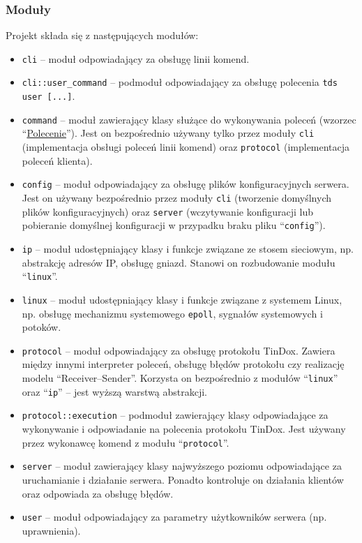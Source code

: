 \documentclass[8pt,a4paper]{article}
\newcommand{\quotes}[1]{``#1''}
\newcommand{\quotcode}[1]{\quotes{\texttt{#1}}}
\begin{document}
\subsubsection{Moduły}
\noindent Projekt składa się z następujących modułów:
\begin{itemize}
    \item \texttt{cli} -- moduł odpowiadający za obsługę linii komend.
    \item \texttt{cli::user\_command} -- podmoduł odpowiadający za obsługę polecenia \texttt{tds user [...]}.
    \item \texttt{command} -- moduł zawierający klasy służące do wykonywania poleceń (wzorzec \quotes{\href{https://en.wikipedia.org/wiki/Command_pattern}{Polecenie}}). Jest on bezpośrednio używany tylko przez moduły \texttt{cli} (implementacja obsługi poleceń linii komend) oraz \texttt{protocol} (implementacja poleceń klienta).
    \item \texttt{config} -- moduł odpowiadający za obsługę plików konfiguracyjnych serwera. Jest on używany bezpośrednio przez moduły \texttt{cli} (tworzenie domyślnych plików konfiguracyjnych) oraz \texttt{server} (wczytywanie konfiguracji lub pobieranie domyślnej konfiguracji w przypadku braku pliku \quotcode{config}).
    \item \texttt{ip} -- moduł udostępniający klasy i funkcje związane ze stosem sieciowym, np. abstrakcję adresów IP, obsługę gniazd. Stanowi on rozbudowanie modułu \quotcode{linux}.
    \item \texttt{linux} -- moduł udostępniający klasy i funkcje związane z systemem Linux, np. obsługę mechanizmu systemowego \texttt{epoll}, sygnałów systemowych i potoków.
    \item \texttt{protocol} -- moduł odpowiadający za obsługę protokołu TinDox. Zawiera między innymi interpreter poleceń, obsługę błędów protokołu czy realizację modelu \quotes{Receiver--Sender}. Korzysta on bezpośrednio z modułów \quotcode{linux} oraz \quotcode{ip} -- jest wyższą warstwą abstrakcji.
    \item \texttt{protocol::execution} -- podmoduł zawierający klasy odpowiadające za wykonywanie i odpowiadanie na polecenia protokołu TinDox. Jest używany przez wykonawcę komend z modułu \quotcode{protocol}.
    \item \texttt{server} -- moduł zawierający klasy najwyższego poziomu odpowiadające za uruchamianie i działanie serwera. Ponadto kontroluje on działania klientów oraz odpowiada za obsługę błędów.
    \item \texttt{user} -- moduł odpowiadający za parametry użytkowników serwera (np. uprawnienia).
\end{itemize}
\end{document}
